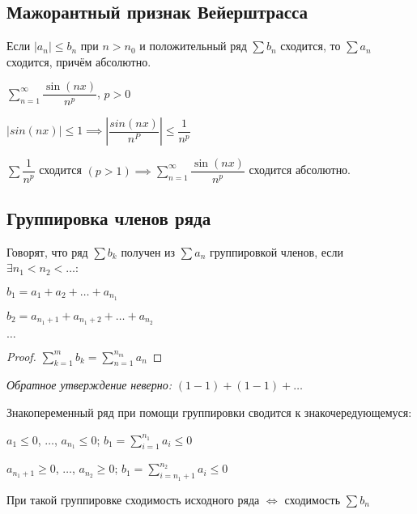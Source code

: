 \subsection{Мажорантный признак Вейерштрасса}

\begin{theorem}
    Если $|a_n| \leq b_n$ при $n > n_0$ и положительный ряд $\sum b_n$ сходится,
    то $\sum a_n$ сходится, причём абсолютно.
\end{theorem}

\begin{example}
$\sum_{n=1}^{\infty} \dfrac{\sin(nx)}{n^p}$, $p > 0$

$|sin(nx)| \leq 1 \implies \left|\dfrac{sin(nx)}{n^P}\right| \leq \dfrac{1}{n^p}$

$\sum \dfrac{1}{n^p} $ сходится $(p > 1) \implies \sum_{n=1}^{\infty} \dfrac{\sin(nx)}{n^p}$ сходится абсолютно.
\end{example}

\subsection{Группировка членов ряда}

Говорят, что ряд $\sum b_k$ получен из $\sum a_n$ группировкой членов, если $\exists n_1 < n_2 < \dots$:

$b_1 = a_1 + a_2 + \dots + a_{n_1}$

$b_2 = a_{n_1 + 1} + a_{n_1 + 2} + \dots + a_{n_2}$

$\dots$

\begin{comment}
    Если $\sum a_n$ сходится, то ряд $\sum b_k$ сходится к той же сумме.
\end{comment}

\begin{proof}
$\sum_{k=1}^{m} b_k = \sum_{n=1}^{n_m} a_n$
\end{proof}

\textit{Обратное утверждение неверно:} $(1 - 1) + (1 - 1) + \dots$

Знакопеременный ряд при помощи группировки сводится к знакочередующемуся:

$a_1 \leq 0$, $\dots$, $a_{n_1} \leq 0$; $b_1 = \sum_{i=1}^{n_1} a_i \leq 0$

$a_{n_1+1} \geq 0$, $\dots$, $a_{n_2} \geq 0$; $b_1 = \sum_{i={n_1 + 1}}^{n_2} a_i \leq 0$

При такой группировке сходимость исходного ряда $\iff$ сходимость $\sum b_n$

